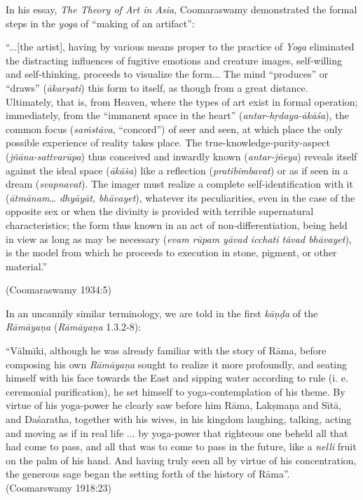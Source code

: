 \smallskip
In his essay, {\sl The Theory of Art in Asia}, Coomaraswamy demonstrated the formal steps in the {\sl yoga} of “making of an artifact”: 

\smallskip
\begin{myquote}
“...[the artist], having by various means proper to the practice of {\sl Yoga} eliminated the distracting influences of fugitive emotions and creature images, self-willing and self-thinking, proceeds to visualize the form... The mind “produces” or “draws” ({\sl ākarṣati}) this form to itself, as though from a great distance. Ultimately, that is, from Heaven, where the types of art exist in formal operation; immediately, from the “immanent space in the heart” ({\sl antar-hṛdaya-ākāśa}), the common focus ({\sl saṁstāva}, “concord”) of seer and seen, at which place the only possible experience of reality takes place. The true-knowledge-purity-aspect ({\sl jñāna-sattvarūpa}) thus conceived and inwardly known ({\sl antar-jñeya}) reveals itself against the ideal space ({\sl ākāṡa}) like a reflection ({\sl pratibimbavat}) or as if seen in a dream ({\sl svapnavat}). The imager must realize a complete self-identification with it ({\sl ātmānam… dhyāyāt, bhāvayet}), whatever its peculiarities, even in the case of the opposite sex or when the divinity is provided with terrible supernatural characteristics; the form thus known in an act of non-differentiation, being held in view as long as may be necessary ({\sl evam rūpam yāvad icchati tāvad bhāvayet}), is the model from which he proceeds to execution in stone, pigment, or other material.” 

\hfill (Coomaraswamy 1934:5)
\end{myquote}

In an uncannily similar terminology, we are told in the first {\sl kāṇḍa} of the {\sl Rāmāyaṇa} ({\sl Rāmāyaṇa} 1.3.2-8):

\begin{myquote}
“Vālmīki, although he was already familiar with the story of Rāma, before composing his own {\sl Rāmāyaṇa} sought to realize it more profoundly, and seating himself with his face towards the East and sipping water according to rule (i. e. ceremonial purification), he set himself to yoga-contemplation of his theme. By virtue of his yoga-power he clearly saw before him Rāma, Lakṣmaṇa and Sītā, and Daśaratha, together with his wives, in his kingdom laughing, talking, acting and moving as if in real life ... by yoga-power that righteous one beheld all that had come to pass, and all that was to come to pass in the future, like a {\sl nelli} fruit on the palm of his hand. And having truly seen all by virtue of his concentration, the generous sage began the setting forth of the history of Rāma”.   
\hfill (Coomarswamy 1918:23)
\end{myquote}

